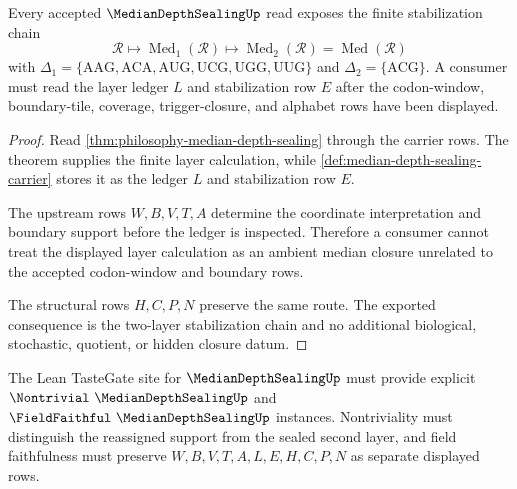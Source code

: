 \begin{theorem}
\label{thm:median-depth-sealing-two-layer-stabilization}
Every accepted $\MedianDepthSealingUp$ read exposes the finite stabilization chain
$$
\mathcal{R}
\longmapsto
\operatorname{Med}_{1}(\mathcal{R})
\longmapsto
\operatorname{Med}_{2}(\mathcal{R})
=
\operatorname{Med}(\mathcal{R})
$$
with $\Delta_{1}=\{\mathrm{AAG},\mathrm{ACA},\mathrm{AUG},\mathrm{UCG},\mathrm{UGG},\mathrm{UUG}\}$ and $\Delta_{2}=\{\mathrm{ACG}\}$. A consumer must read the layer ledger $L$ and stabilization row $E$ after the codon-window, boundary-tile, coverage, trigger-closure, and alphabet rows have been displayed.
\end{theorem}
\begin{proof}
Read \autoref{thm:philosophy-median-depth-sealing} through the carrier rows. The theorem supplies the finite layer calculation, while \autoref{def:median-depth-sealing-carrier} stores it as the ledger $L$ and stabilization row $E$.

The upstream rows $W,B,V,T,A$ determine the coordinate interpretation and boundary support before the ledger is inspected. Therefore a consumer cannot treat the displayed layer calculation as an ambient median closure unrelated to the accepted codon-window and boundary rows.

The structural rows $H,C,P,N$ preserve the same route. The exported consequence is the two-layer stabilization chain and no additional biological, stochastic, quotient, or hidden closure datum.
\end{proof}



The Lean TasteGate site for $\MedianDepthSealingUp$ must provide explicit $\Nontrivial\ \MedianDepthSealingUp$ and $\FieldFaithful\ \MedianDepthSealingUp$ instances. Nontriviality must distinguish the reassigned support from the sealed second layer, and field faithfulness must preserve $W,B,V,T,A,L,E,H,C,P,N$ as separate displayed rows.

